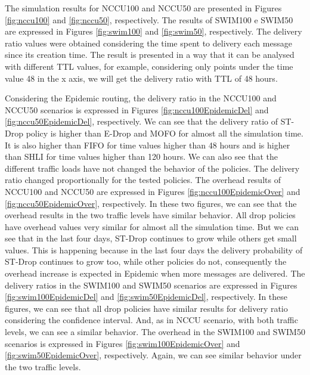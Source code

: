 The simulation results for NCCU100 and NCCU50 are presented in Figures \ref{fig:nccu100} and \ref{fig:nccu50}, respectively. The results of SWIM100 e SWIM50 are expressed in Figures \ref{fig:swim100} and \ref{fig:swim50}, respectively. The delivery ratio values were obtained considering the time spent to delivery each message since its creation time. The result is presented in a way that it can be analysed with different TTL values, for example, considering only points under the time value 48 in the x axis, we will get the delivery ratio with TTL of 48 hours.

Considering the Epidemic routing, the delivery ratio in the NCCU100 and NCCU50 scenarios is expressed in Figures \ref{fig:nccu100EpidemicDel} and \ref{fig:nccu50EpidemicDel}, respectively. We can see that the delivery ratio of ST-Drop policy is higher than E-Drop and MOFO for almost all the simulation time. It is also higher than FIFO for time values
higher than 48 hours and is higher than SHLI for time values higher than 120 hours. We can also see that the different traffic loads have not changed the behavior of the policies. The delivery ratio changed proportionally for the tested policies. The overhead results of NCCU100 and NCCU50 are expressed in Figures \ref{fig:nccu100EpidemicOver} and
\ref{fig:nccu50EpidemicOver}, respectively. In these two figures, we can see that the overhead results in the two traffic levels have similar behavior. All drop policies have overhead values very similar for almost all the simulation time. But we can see that in the last four days, ST-Drop continues to grow while others get small values. This is happening because in the last four days the delivery probability of ST-Drop continues to grow too, while other policies do not, consequently the overhead increase is
expected in Epidemic when more messages are delivered. The delivery ratios in the SWIM100 and SWIM50 scenarios are expressed in Figures \ref{fig:swim100EpidemicDel} and \ref{fig:swim50EpidemicDel}, respectively. In these figures, we can see that all drop policies have similar results for delivery ratio considering the confidence interval.
And, as in NCCU scenario, with both traffic levels, we can see a similar behavior. The overhead in the SWIM100 and SWIM50 scenarios is expressed in Figures \ref{fig:swim100EpidemicOver} and \ref{fig:swim50EpidemicOver}, respectively. Again, we can see similar behavior under the two traffic levels.

